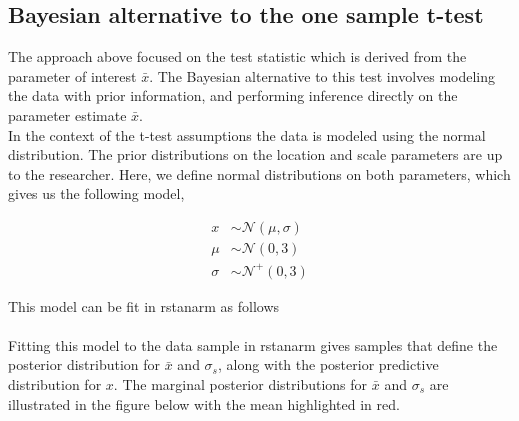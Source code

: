 \documentclass[12pt]{article}
\begin{document}
\subsection{Bayesian alternative to the one sample t-test}

The approach above focused on the test statistic which is derived from the parameter of interest $\bar{x}$. The Bayesian alternative to this test involves modeling the data with prior information, and performing inference directly on the parameter estimate $\bar{x}$. \\

\noindent In the context of the t-test assumptions the data is modeled using the normal distribution. The prior distributions on the location and scale parameters are up to the researcher. Here, we define normal distributions on both parameters, which gives us the following model,

\begin{align*}
x &\sim \mathcal{N}(\mu, \sigma) \\
\mu &\sim \mathcal{N}(0,3) \\
\sigma &\sim \mathcal{N}^{+}(0,3)
\end{align*}

\noindent This model can be fit in rstanarm as follows \\

 \\

\noindent Fitting this model to the data sample in rstanarm gives samples that define the posterior distribution for $\bar{x}$ and $\sigma_s$, along with the posterior predictive distribution for $x$. The marginal posterior distributions for $\bar{x}$ and $\sigma_s$ are illustrated in the figure below with the mean highlighted in red. \\
\end{document}
